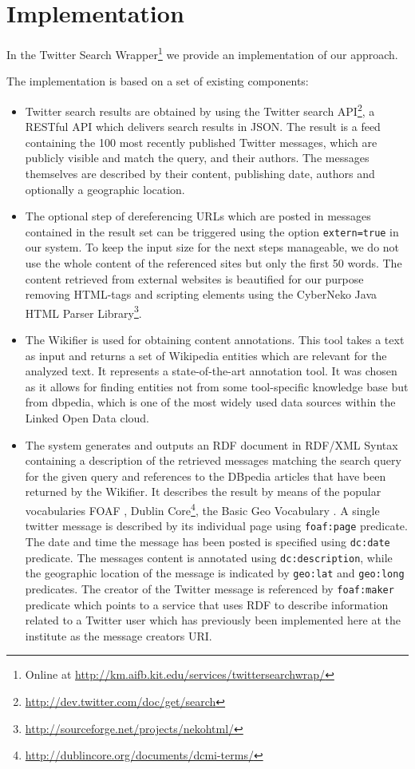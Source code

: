 \documentclass{llncs}
\begin{document}
\section{Implementation}

In the Twitter Search Wrapper\footnote{Online at \url{http://km.aifb.kit.edu/services/twittersearchwrap/}} we provide an implementation of our approach.

The implementation is based on a set of existing components: 
\begin{itemize}
\item Twitter search results are obtained by using the Twitter search API\footnote{\url{http://dev.twitter.com/doc/get/search}}, a RESTful API which delivers search results in JSON. The result is a feed containing the 100 most recently published Twitter messages, which are publicly visible and match the query, and their authors. The messages themselves are described by their content, publishing date, authors
and optionally a geographic location.

\item The optional step of dereferencing URLs which are posted in messages contained
in the result set can be triggered using the option \texttt{extern=true} in our
system. To keep the input size for the next steps manageable, we do not use the
whole content of the referenced sites but only the first 50 words. The content
retrieved from external websites is beautified for our purpose removing
HTML-tags and scripting elements using the CyberNeko Java HTML Parser
Library\footnote{\url{http://sourceforge.net/projects/nekohtml/}}.

\item The Wikifier \cite{key:wikifier} is used for obtaining content annotations. This tool takes a text as input and returns a set of Wikipedia entities which are relevant for the analyzed text. It represents a state-of-the-art annotation tool. It was chosen as it allows for finding entities not from some tool-specific knowledge base but from dbpedia, which is one of the most widely used data sources within the Linked Open Data cloud.

\item The system generates and outputs an RDF document in RDF/XML Syntax containing a
description of the retrieved messages matching the search query for the given query and references to the DBpedia articles that have been returned by the Wikifier. It describes
the result by means of the popular vocabularies FOAF \cite{key:foaf}, Dublin
Core\footnote{\url{http://dublincore.org/documents/dcmi-terms/}}, the Basic Geo
Vocabulary \cite{key:geo}. A single twitter message is described by its
individual page using \texttt{foaf:page} predicate. The date and time the
message has been posted is specified using \texttt{dc:date} predicate. The messages content
is annotated using \texttt{dc:description}, while the geographic location of the
message is indicated by \texttt{geo:lat} and \texttt{geo:long} predicates. The
creator of the Twitter message is referenced by \texttt{foaf:maker} predicate which points to a service that
uses RDF to describe information related to a Twitter user which has previously
been implemented here at the institute as the message creators URI.


\end{itemize}
\end{document}
